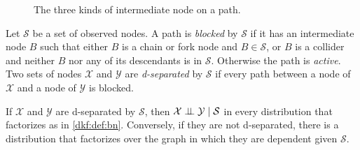 \begin{notechapter}
\begin{figure}[ht]
\centering
{}
\caption{The three kinds of intermediate node on a path.}
\label{dkf:fig:connections}
\end{figure}

\begin{definition}[d-separation]\label{dkf:def:dsep}
Let $\mathcal S$ be a set of observed nodes. A path is \emph{blocked} by $\mathcal S$ if it has an intermediate node $B$
such that either $B$ is a chain or fork node and $B\in\mathcal S$, or $B$ is a collider and neither $B$ nor any of its
descendants is in $\mathcal S$. Otherwise the path is \emph{active}. Two sets of nodes $\mathcal X$ and $\mathcal Y$ are \emph{d-separated}
by $\mathcal S$ if every path between a node of $\mathcal X$ and a node of $\mathcal Y$ is blocked.
\end{definition}

\begin{theorem}\label{dkf:thm:dsep}
If $\mathcal X$ and $\mathcal Y$ are d-separated by $\mathcal S$, then $\mathcal X\mathrel{\perp\!\!\!\perp}\mathcal Y\mid\mathcal S$ in every distribution that factorizes as in
\cref{dkf:def:bn}. Conversely, if they are not d-separated, there is a distribution that
factorizes over the graph in which they are dependent given $\mathcal S$.
\end{theorem}


\end{notechapter}
